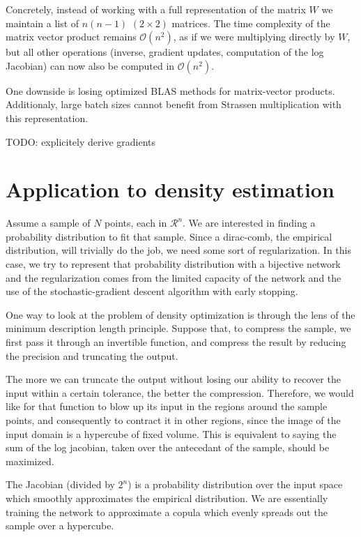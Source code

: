 \documentclass{article}
\begin{document}
Concretely, instead of working with a full representation of the matrix \(W\) we
maintain a list of \(n(n-1)\) \((2 \times 2)\) matrices. The time complexity of
the matrix vector product remains \(\mathcal{O}(n^2)\), as if we were
multiplying directly by \(W\), but all other operations
(inverse, gradient updates, computation of the log Jacobian) can now
also be computed in \(\mathcal{O}(n^2)\).

One downside is losing optimized BLAS methods for matrix-vector products.
Additionaly, large batch sizes cannot benefit from Strassen multiplication
with this representation.


TODO: explicitely derive gradients

\section{Application to density estimation}

Assume a sample of \(N\) points, each in \(\mathcal{R}^n\). We are interested in
finding a probability distribution to fit that sample. Since a dirac-comb,
the empirical distribution, will trivially do the job, we need some sort of
regularization. In this case, we try to represent that probability distribution
with a bijective network and the regularization comes from the limited
capacity of the network and the use of the stochastic-gradient descent
algorithm with early stopping.

One way to look at the problem of density optimization is through the lens of
the minimum description length principle. Suppose that, to compress the
sample, we first pass it through an invertible function, and compress the
result by reducing the precision and truncating the output.

The more we can truncate the output without losing our ability to recover the
input within a certain tolerance, the better the compression.
Therefore, we would like for that function to blow up its input in the
regions around the sample points, and consequently to contract it in other
regions, since the image of the input domain is a hypercube of fixed volume.
This is equivalent to saying the sum of the log jacobian, taken over the
antecedant of the sample, should be maximized.

The Jacobian (divided by \(2^n\)) is a probability distribution
over the input space which smoothly approximates the empirical distribution.
We are essentially training the network to approximate a copula which evenly
spreads out the sample over a hypercube.
\end{document}
